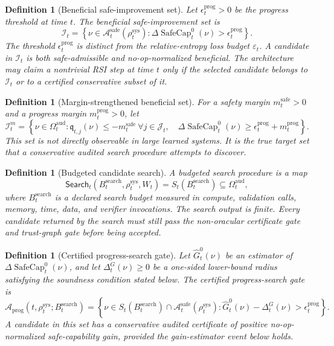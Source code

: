 \documentclass[11pt,a4paper]{article}
\newtheorem{definition}[theorem]{Definition}
\newcommand{\Acal}{\mathcal A}
\newcommand{\eps}{\varepsilon}
\newcommand{\sys}{\mathrm{sys}}
\newcommand{\safe}{\mathrm{safe}}
\newcommand{\aud}{\mathrm{aud}}
\newcommand{\SafeCap}{\operatorname{SafeCap}}
\newcommand{\search}{\mathrm{search}}
\begin{document}
\begin{definition}[Beneficial safe-improvement set]
\label{def:beneficial-safe-improvement-set}
Let \(\epsilon_t^{\mathrm{prog}}>0\) be the progress threshold at time \(t\).  The beneficial safe-improvement set is
\[
\boxed{
\mathcal I_t
=
\left\{
\nu\in\Acal_t^{\safe}(\rho_t^{\sys})
:
\Delta\SafeCap_t^{0}(\nu)>\epsilon_t^{\mathrm{prog}}
\right\}.
}
\]
The threshold \(\epsilon_t^{\mathrm{prog}}\) is distinct from the relative-entropy loss budget \(\eps_t\).  A candidate in \(\mathcal I_t\) is both safe-admissible and no-op-normalized beneficial.  The architecture may claim a nontrivial RSI step at time \(t\) only if the selected candidate belongs to \(\mathcal I_t\) or to a certified conservative subset of it.
\end{definition}

\begin{definition}[Margin-strengthened beneficial set]
\label{def:margin-strengthened-beneficial-set}
For a safety margin \(m_t^{\safe}>0\) and a progress margin \(m_t^{\mathrm{prog}}>0\), let
\[
\mathcal I_t^{m}
=
\left\{
\nu\in\Omega_t^{\aud}:
\mathfrak q_{t,j}(\nu)\le -m_t^{\safe}\ \forall j\in\mathcal J_t,
\quad
\Delta\SafeCap_t^{0}(\nu)\ge \epsilon_t^{\mathrm{prog}}+m_t^{\mathrm{prog}}
\right\}.
\]
This set is not directly observable in large learned systems.  It is the true target set that a conservative audited search procedure attempts to discover.
\end{definition}

\begin{definition}[Budgeted candidate search]
\label{def:budgeted-candidate-search}
A budgeted search procedure is a map
\[
\mathsf{Search}_t(B_t^{\search},\rho_t^{\sys},W_t)
=
S_t(B_t^{\search})\subseteq\Omega_t^{\aud},
\]
where \(B_t^{\search}\) is a declared search budget measured in compute, validation calls, memory, time, data, and verifier invocations.  The search output is finite.  Every candidate returned by the search must still pass the non-oracular certificate gate and trust-graph gate before being accepted.
\end{definition}

\begin{definition}[Certified progress-search gate]
\label{def:certified-progress-search-gate}
Let \(\widehat G_t^{0}(\nu)\) be an estimator of \(\Delta\SafeCap_t^{0}(\nu)\), and let \(\Delta_t^{G}(\nu)\ge0\) be a one-sided lower-bound radius satisfying the soundness condition stated below.  The certified progress-search gate is
\[
\Acal_{\mathrm{prog}}(t,\rho_t^{\sys};B_t^{\search})
=
\left\{
\nu\in S_t(B_t^{\search})\cap\Acal_t^{\safe}(\rho_t^{\sys}):
\widehat G_t^{0}(\nu)-\Delta_t^{G}(\nu)>\epsilon_t^{\mathrm{prog}}
\right\}.
\]
A candidate in this set has a conservative audited certificate of positive no-op-normalized safe-capability gain, provided the gain-estimator event below holds.
\end{definition}
\end{document}
